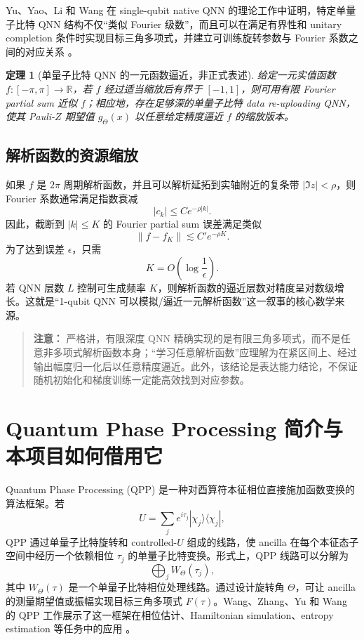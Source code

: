 \documentclass[UTF8,zihao=-4]{ctexart}
\newtheorem{theorem}{定理}
\newenvironment{warningbox}{\begin{quote}\small\noindent\textbf{注意：}}{\end{quote}}
\begin{document}
Yu、Yao、Li 和 Wang 在 single-qubit native QNN 的理论工作中证明，特定单量子比特 QNN 结构不仅“类似 Fourier 级数”，而且可以在满足有界性和 unitary completion 条件时实现目标三角多项式，并建立可训练旋转参数与 Fourier 系数之间的对应关系 \cite{yu2022singlequbit}。

\begin{theorem}[单量子比特 QNN 的一元函数逼近，非正式表述]
给定一元实值函数 $f:[-\pi,\pi]\to\mathbb{R}$，若 $f$ 经过适当缩放后有界于 $[-1,1]$，则可用有限 Fourier partial sum 近似 $f$；相应地，存在足够深的单量子比特 data re-uploading QNN，使其 Pauli-$Z$ 期望值 $g_\Theta(x)$ 以任意给定精度逼近 $f$ 的缩放版本。
\end{theorem}

\subsection{解析函数的资源缩放}

如果 $f$ 是 $2\pi$ 周期解析函数，并且可以解析延拓到实轴附近的复条带 $|\Im z|<\rho$，则 Fourier 系数通常满足指数衰减
\begin{equation}
    |c_k|\le C e^{-\rho |k|}.
\end{equation}
因此，截断到 $|k|\le K$ 的 Fourier partial sum 误差满足类似
\begin{equation}
    \|f-f_K\|\lesssim C' e^{-\rho K}.
\end{equation}
为了达到误差 $\epsilon$，只需
\begin{equation}
    K=O\!\left(\log\frac{1}{\epsilon}\right).
\end{equation}
若 QNN 层数 $L$ 控制可生成频率 $K$，则解析函数的逼近层数对精度呈对数级增长。这就是“1-qubit QNN 可以模拟/逼近一元解析函数”这一叙事的核心数学来源。

\begin{warningbox}
严格讲，有限深度 QNN 精确实现的是有限三角多项式，而不是任意非多项式解析函数本身；“学习任意解析函数”应理解为在紧区间上、经过输出幅度归一化后以任意精度逼近。此外，该结论是表达能力结论，不保证随机初始化和梯度训练一定能高效找到对应参数。
\end{warningbox}

\section{Quantum Phase Processing 简介与本项目如何借用它}

Quantum Phase Processing (QPP) 是一种对酉算符本征相位直接施加函数变换的算法框架。若
\begin{equation}
    U=\sum_j e^{i\tau_j}|\chi_j\rangle\langle\chi_j|,
\end{equation}
QPP 通过单量子比特旋转和 controlled-$U$ 组成的线路，使 ancilla 在每个本征态子空间中经历一个依赖相位 $\tau_j$ 的单量子比特变换。形式上，QPP 线路可以分解为
\begin{equation}
    \bigoplus_j W_\Theta(\tau_j),
\end{equation}
其中 $W_\Theta(\tau)$ 是一个单量子比特相位处理线路。通过设计旋转角 $\Theta$，可让 ancilla 的测量期望值或振幅实现目标三角多项式 $F(\tau)$。Wang、Zhang、Yu 和 Wang 的 QPP 工作展示了这一框架在相位估计、Hamiltonian simulation、entropy estimation 等任务中的应用 \cite{wang2023qpp}。
\end{document}
